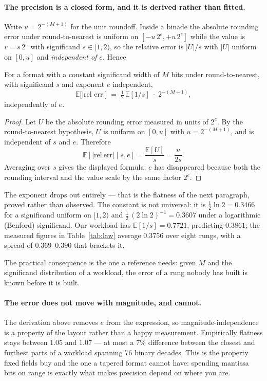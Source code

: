 \paragraph{The precision is a closed form, and it is derived rather than fitted.}
Write $u = 2^{-(M+1)}$ for the unit roundoff. Inside a binade the absolute
rounding error under round-to-nearest is uniform on $[-u\,2^{e}, +u\,2^{e}]$
while the value is $v = s\,2^{e}$ with significand $s \in [1,2)$, so the relative
error is $|U|/s$ with $|U|$ uniform on $[0,u]$ and \emph{independent of $e$}.
Hence
\begin{theorem}\label{thm:law}
For a format with a constant significand width of $M$ bits under
round-to-nearest, with significand $s$ and exponent $e$ independent,
\[
  \mathbb{E}\bigl[|\text{rel err}|\bigr] \;=\; \tfrac{1}{2}\,\mathbb{E}[1/s]\;\cdot\;2^{-(M+1)} ,
\]
independently of $e$.
\end{theorem}
\begin{proof}
Let $U$ be the absolute rounding error measured in units of $2^e$.  By the
round-to-nearest hypothesis, $U$ is uniform on $[0,u]$ with
$u=2^{-(M+1)}$, and is independent of $s$ and $e$.  Therefore
\[
  \mathbb{E}[|\mathrm{rel\ err}|\mid s,e]
  = \frac{\mathbb{E}[U]}{s}
  = \frac{u}{2s}.
\]
Averaging over $s$ gives the displayed formula; $e$ has disappeared because both
the rounding interval and the value scale by the same factor $2^e$.
\end{proof}
The exponent drops out entirely --- that is the flatness of the next paragraph,
proved rather than observed. The constant is not universal: it is
$\tfrac{1}{2}\ln 2 = 0.3466$ for a significand uniform on $[1,2)$ and
$\tfrac{1}{2}\,(2\ln 2)^{-1} = 0.3607$ under a logarithmic (Benford) significand.
Our workload has $\mathbb{E}[1/s] = 0.7721$, predicting $0.3861$; the measured
figures in Table~\ref{tab:law} average $0.3756$ over eight rungs, with a spread
of $0.369$--$0.390$ that brackets it.

The practical consequence is the one a reference needs: given $M$ and the
significand distribution of a workload, the error of a rung nobody has built is
known before it is built.

\paragraph{The error does not move with magnitude, and cannot.} The derivation
above removes $e$ from the expression, so magnitude-independence is a property of
the layout rather than a happy measurement. Empirically flatness stays between
$1.05$ and $1.07$ --- at most a $7\%$ difference between the closest and furthest
parts of a workload spanning 76 binary decades. This is the property fixed fields
buy and the one a tapered format cannot have: spending mantissa bits on range is
exactly what makes precision depend on where you are.

